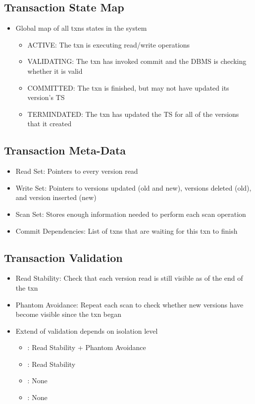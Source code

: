 \documentclass[11pt]{article}
\begin{document}
    \subsection*{Transaction State Map}
    \begin{itemize}
        \item Global map of all txns states in the system
        \begin{itemize}
            \item ACTIVE: The txn is executing read/write operations
            \item VALIDATING: The txn has invoked commit and the DBMS is checking whether it is valid
            \item COMMITTED: The txn is finished, but may not have updated its version's TS
            \item TERMINDATED: The txn has updated the TS for all of the versions that it created
        \end{itemize}
    \end{itemize}
    \subsection*{Transaction Meta-Data}
    \begin{itemize}
        \item Read Set: Pointers to every version read
        \item Write Set: Pointers to versions updated (old and new), versions deleted (old), and version inserted (new)
        \item Scan Set: Stores enough information needed to perform each scan operation
        \item Commit Dependencies: List of txns that are waiting for this txn to finish
    \end{itemize}
    \subsection*{Transaction Validation}
    \begin{itemize}
        \item Read Stability: Check that each version read is still visible as of the end of the txn
        \item Phantom Avoidance: Repeat each scan to check whether new versions have become visible since the txn began
        \item Extend of validation depends on isolation level
        \begin{itemize}
            \item {}: Read Stability + Phantom Avoidance
            \item {}: Read Stability
            \item {}: None
            \item {}: None
        \end{itemize}
    \end{itemize}
\end{document}
